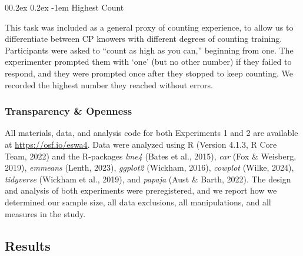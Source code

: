 \documentclass[
  man,floatsintext]{apa7}
\makeatletter
\let\oldparagraph\paragraph
\renewcommand{\paragraph}[1]{\oldparagraph{#1}\mbox{}}
\renewcommand{\paragraph}{\@startsection{paragraph}{4}{\parindent}%
  {0\baselineskip \@plus 0.2ex \@minus 0.2ex}%
  {-1em}%
  {\normalfont\normalsize\bfseries\itshape\typesectitle}}
\renewcommand{\paragraph}{\@startsection{paragraph}{4}{\parindent}%
  {0\baselineskip \@plus 0.2ex \@minus 0.2ex}%
  {-1em}%
  {\normalfont\normalsize\bfseries\typesectitle}}
\makeatother
\begin{document}
\hypertarget{highest-count}{%
\paragraph{Highest Count}\label{highest-count}}

This task was included as a general proxy of counting experience, to allow us to differentiate between CP knowers with different degrees of counting training. Participants were asked to ``count as high as you can,'' beginning from one. The experimenter prompted them with `one' (but no other number) if they failed to respond, and they were prompted once after they stopped to keep counting. We recorded the highest number they reached without errors.

\hypertarget{transparency-openness}{%
\subsubsection{Transparency \& Openness}\label{transparency-openness}}

All materials, data, and analysis code for both Experiments 1 and 2 are available at \url{https://osf.io/eswa4}. Data were analyzed using R (Version 4.1.3, R Core Team, 2022) and the R-packages \emph{lme4} (Bates et al., 2015), \emph{car} (Fox \& Weisberg, 2019), \emph{emmeans} (Lenth, 2023), \emph{ggplot2} (Wickham, 2016), \emph{cowplot} (Wilke, 2024), \emph{tidyverse} (Wickham et al., 2019), and \emph{papaja} (Aust \& Barth, 2022). The design and analysis of both experiments were preregistered, and we report how we determined our sample size, all data exclusions, all manipulations, and all measures in the study.

\hypertarget{results}{%
\subsection{Results}\label{results}}
\end{document}
